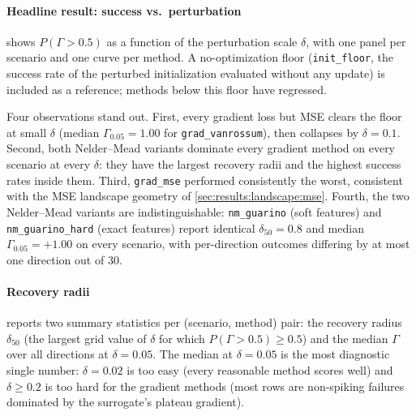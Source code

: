 \paragraph{Headline result: success vs.\ perturbation}
 shows $P(\Gamma > 0.5)$ as a function of the perturbation scale $\delta$, with one panel per scenario and one curve per method.
A no-optimization floor (\texttt{init\_floor}, the success rate of the perturbed initialization evaluated without any update) is included as a reference; methods below this floor have regressed.

Four observations stand out.
First, every gradient loss but \gls{MSE} clears the floor at small $\delta$ (median $\Gamma_{0.05}=1.00$ for \texttt{grad\_vanrossum}), then collapses by $\delta=0.1$.
Second, both Nelder--Mead variants dominate every gradient method on every scenario at every $\delta$: they have the largest recovery radii and the highest success rates inside them.
Third, \texttt{grad\_mse} performed consistently the worst, consistent with the \gls{MSE} landscape geometry of \cref{sec:results:landscape:mse}.
Fourth, the two Nelder--Mead variants are indistinguishable: \texttt{nm\_guarino} (soft features) and \texttt{nm\_guarino\_hard} (exact features) report identical $\delta_{50}=0.8$ and median $\Gamma_{0.05}=+1.00$ on every scenario, with per-direction outcomes differing by at most one direction out of 30.

\paragraph{Recovery radii}
 reports two summary statistics per (scenario, method) pair:
the recovery radius $\delta_{50}$ (the largest grid value of $\delta$ for which $P(\Gamma>0.5)\geq 0.5$) and the median $\Gamma$ over all directions at $\delta = 0.05$.
The median at $\delta = 0.05$ is the most diagnostic single number: $\delta = 0.02$ is too easy (every reasonable method scores well) and $\delta \geq 0.2$ is too hard for the gradient methods (most rows are non-spiking failures dominated by the surrogate's plateau gradient).

